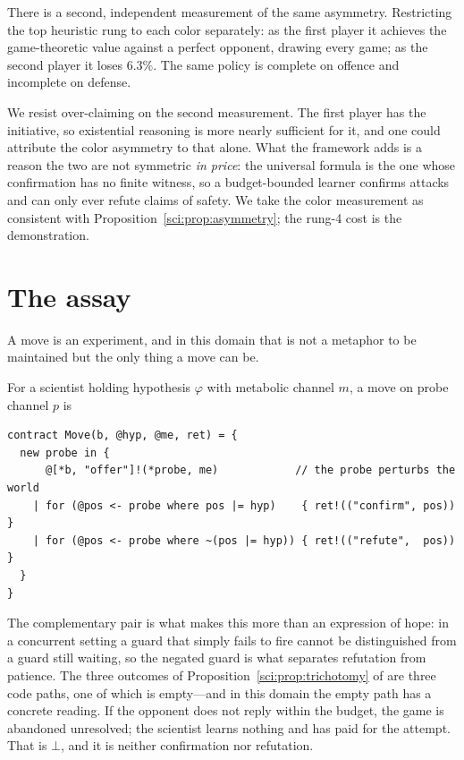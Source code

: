 There is a second, independent measurement of the same asymmetry. Restricting
the top heuristic rung to each color separately: as the first player it
achieves the game-theoretic value against a perfect opponent, drawing every
game; as the second player it loses $6.3\%$. The same policy is complete on
offence and incomplete on defense.

\begin{remark}\label{gam:reading-offered-as-such}
We resist over-claiming on the second measurement. The first player has the
initiative, so existential reasoning is more nearly sufficient for it, and one
could attribute the color asymmetry to that alone. What the framework adds is a
reason the two are not symmetric \emph{in price}: the universal formula is the
one whose confirmation has no finite witness, so a budget-bounded learner
confirms attacks and can only ever refute claims of safety. We take the color
measurement as consistent with Proposition~\ref{sci:prop:asymmetry}; the rung-4 cost is the
demonstration.
\end{remark}

\section{The assay}\label{gam:sec:assay}\label{gam:S6}

A move is an experiment, and in this domain that is not a metaphor to be
maintained but the only thing a move can be.

\begin{definition}\label{gam:move-assay}
For a scientist holding hypothesis $\varphi$ with metabolic channel $m$,
a move on probe channel $p$ is
\begin{center}
\begin{minipage}{0.9\textwidth}
\begin{lstlisting}
contract Move(b, @hyp, @me, ret) = {
  new probe in {
      @[*b, "offer"]!(*probe, me)            // the probe perturbs the world
    | for (@pos <- probe where pos |= hyp)    { ret!(("confirm", pos)) }
    | for (@pos <- probe where ~(pos |= hyp)) { ret!(("refute",  pos)) }
  }
}
\end{lstlisting}
\end{minipage}
\end{center}
\end{definition}

The complementary pair is what makes this more than an expression of hope: in a
concurrent setting a guard that simply fails to fire cannot be distinguished
from a guard still waiting, so the negated guard is what separates refutation
from patience. The three outcomes of Proposition~\ref{sci:prop:trichotomy} of \chSci are
three code paths, one of which is empty---and in this domain the empty path has
a concrete reading. If the opponent does not reply within the budget, the game
is abandoned unresolved; the scientist learns nothing and has paid for the
attempt. That is $\bot$, and it is neither confirmation nor refutation.

